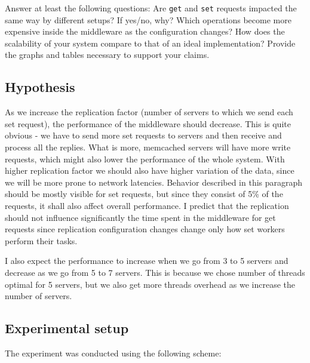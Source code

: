 \documentclass[11pt]{article}
\begin{document}
Answer at least the following questions: Are \texttt{get} and \texttt{set} requests impacted the same way by different setups? If yes/no, why? Which operations become more expensive inside the middleware as the configuration changes? How does the scalability of your system compare to that of an ideal implementation? Provide the graphs and tables necessary to support your claims.
\fi

\subsection{Hypothesis}
\label{sec:replication-hyphotesis}

As we increase the replication factor (number of servers to which we send each set request), the performance of the middleware should decrease. This is quite obvious - we have to send more set requests to servers and then receive and process all the replies. What is more, memcached servers will have more write requests, which might also lower the performance of the whole system. With higher replication factor we should also have higher variation of the data, since we will be more prone to network latencies. Behavior described in this paragraph should be mostly visible for set requests, but since they consist of 5\% of the requests, it shall also affect overall performance. I predict that the replication should not influence significantly the time spent in the middleware for get requests since replication configuration changes change only how set workers perform their tasks.

I also expect the performance to increase when we go from 3 to 5 servers and decrease as we go from 5 to 7 servers. This is because we chose number of threads optimal for 5 servers, but we also get more threads overhead as we increase the number of servers.

\subsection{Experimental setup}

The experiment was conducted using the following scheme:
\end{document}
